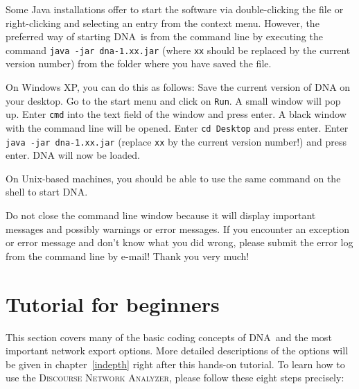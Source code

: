 \documentclass[12pt,a4paper]{scrreprt}
\newcommand{\dnalong}{\textsc{Discourse} \textsc{Network} \textsc{Analyzer}}
\newcommand{\dnashort}{\textsc{DNA}}
\newcommand{\code}[1]{\texttt{#1}}
\begin{document}
Some Java installations offer to start the software via double-clicking the file or right-clicking and selecting an entry from the context menu. However, the preferred way of starting \dnashort\ is from the command line by executing the command \code{java -jar dna-1.xx.jar} (where \code{xx} should be replaced by the current version number) from the folder where you have saved the file.

On Windows XP, you can do this as follows: Save the current version of DNA on your desktop. Go to the start menu and click on \code{Run}. A small window will pop up. Enter \code{cmd} into the text field of the window and press enter. A black window with the command line will be opened. Enter \code{cd Desktop} and press enter. Enter \code{java -jar dna-1.xx.jar} (replace \code{xx} by the current version number!) and press enter. DNA will now be loaded.

On Unix-based machines, you should be able to use the same command on the shell to start \dnashort.

Do not close the command line window because it will display important messages and possibly warnings or error messages. If you encounter an exception or error message and don't know what you did wrong, please submit the error log from the command line by e-mail! Thank you very much!

\chapter{Tutorial for beginners}\label{demo}
This section covers many of the basic coding concepts of \dnashort\ and the most important network export options. More detailed descriptions of the options will be given in chapter~\ref{indepth} right after this hands-on tutorial. To learn how to use the \dnalong, please follow these eight steps precisely:
\end{document}
